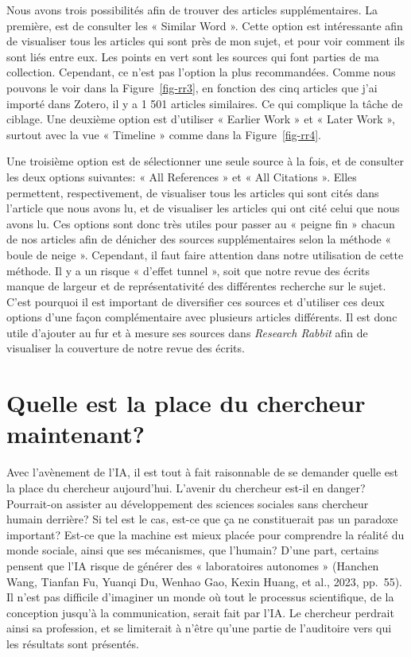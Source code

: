 \documentclass[
  letterpaper,
  DIV=11,
  numbers=noendperiod]{scrreprt}
\begin{document}
Nous avons trois possibilités afin de trouver des articles
supplémentaires. La première, est de consulter les « Similar Word ».
Cette option est intéressante afin de visualiser tous les articles qui
sont près de mon sujet, et pour voir comment ils sont liés entre eux.
Les points en vert sont les sources qui font parties de ma collection.
Cependant, ce n'est pas l'option la plus recommandées. Comme nous
pouvons le voir dans la Figure~\ref{fig-rr3}, en fonction des cinq
articles que j'ai importé dans Zotero, il y a 1 501 articles similaires.
Ce qui complique la tâche de ciblage. Une deuxième option est d'utiliser
« Earlier Work » et « Later Work », surtout avec la vue « Timeline »
comme dans la Figure~\ref{fig-rr4}.

Une troisième option est de sélectionner une seule source à la fois, et
de consulter les deux options suivantes: « All References » et « All
Citations ». Elles permettent, respectivement, de visualiser tous les
articles qui sont cités dans l'article que nous avons lu, et de
visualiser les articles qui ont cité celui que nous avons lu. Ces
options sont donc très utiles pour passer au « peigne fin » chacun de
nos articles afin de dénicher des sources supplémentaires selon la
méthode « boule de neige ». Cependant, il faut faire attention dans
notre utilisation de cette méthode. Il y a un risque « d'effet tunnel »,
soit que notre revue des écrits manque de largeur et de représentativité
des différentes recherche sur le sujet. C'est pourquoi il est important
de diversifier ces sources et d'utiliser ces deux options d'une façon
complémentaire avec plusieurs articles différents. Il est donc utile
d'ajouter au fur et à mesure ses sources dans \emph{Research Rabbit}
afin de visualiser la couverture de notre revue des écrits.

\section{Quelle est la place du chercheur
maintenant?}\label{quelle-est-la-place-du-chercheur-maintenant}

Avec l'avènement de l'IA, il est tout à fait raisonnable de se demander
quelle est la place du chercheur aujourd'hui. L'avenir du chercheur
est-il en danger? Pourrait-on assister au développement des sciences
sociales sans chercheur humain derrière? Si tel est le cas, est-ce que
ça ne constituerait pas un paradoxe important? Est-ce que la machine est
mieux placée pour comprendre la réalité du monde sociale, ainsi que ses
mécanismes, que l'humain? D'une part, certains pensent que l'IA risque
de générer des « laboratoires autonomes » (Hanchen Wang, Tianfan Fu,
Yuanqi Du, Wenhao Gao, Kexin Huang, et al., 2023, pp.~55). Il n'est pas
difficile d'imaginer un monde où tout le processus scientifique, de la
conception jusqu'à la communication, serait fait par l'IA. Le chercheur
perdrait ainsi sa profession, et se limiterait à n'être qu'une partie de
l'auditoire vers qui les résultats sont présentés.
\end{document}
